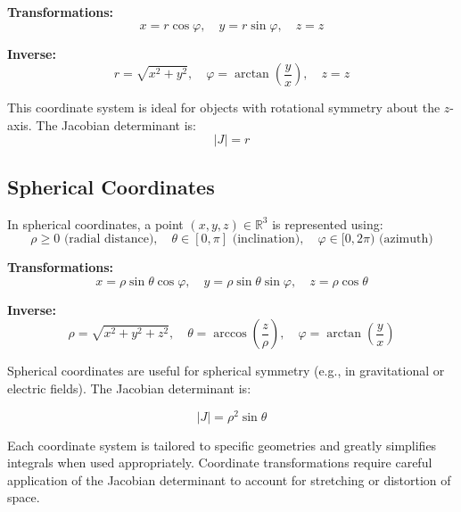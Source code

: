 \textbf{Transformations:}
\[
x = r \cos \varphi, \quad y = r \sin \varphi, \quad z = z
\]

\textbf{Inverse:}
\[
r = \sqrt{x^2 + y^2}, \quad \varphi = \arctan\left(\frac{y}{x}\right), \quad z = z
\]

This coordinate system is ideal for objects with rotational symmetry about the \( z \)-axis. The Jacobian determinant is:
\[
|J| = r
\]


\subsection{Spherical Coordinates}

In spherical coordinates, a point \( (x, y, z) \in \mathbb{R}^3 \) is represented using:
\[
\rho \ge 0 \text{ (radial distance)}, \quad \theta \in [0, \pi] \text{ (inclination)}, \quad \varphi \in [0, 2\pi) \text{ (azimuth)}
\]

\textbf{Transformations:}
\[
x = \rho \sin \theta \cos \varphi, \quad y = \rho \sin \theta \sin \varphi, \quad z = \rho \cos \theta
\]

\textbf{Inverse:}
\[
\rho = \sqrt{x^2 + y^2 + z^2}, \quad \theta = \arccos\left(\frac{z}{\rho}\right), \quad \varphi = \arctan\left(\frac{y}{x}\right)
\]

Spherical coordinates are useful for spherical symmetry (e.g., in gravitational or electric fields). The Jacobian determinant is:

\[
|J| = \rho^2 \sin \theta
\]


Each coordinate system is tailored to specific geometries and greatly 
simplifies integrals when used appropriately. 
Coordinate transformations require careful application of the Jacobian 
determinant to account for stretching or distortion of space.

